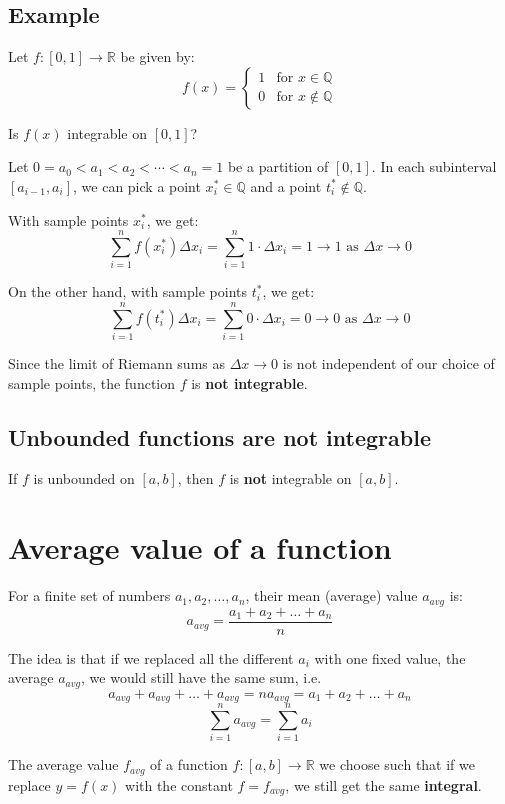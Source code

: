 \documentclass[11pt]{article}
\begin{document}
\subsection{Example}
\label{sec:orgc87e8b1}
Let \(f : [0, 1] \rightarrow \mathbb{R}\) be given by:
\[
f(x) = \begin{cases}
1 & \text{for } x \in \mathbb{Q} \\
0 & \text{for } x \notin \mathbb{Q}
\end{cases}
\]

Is \(f(x)\) integrable on \([0, 1]\)?


Let \(0 = a_0 < a_1 < a_2 < \cdots < a_n = 1\) be a partition of \([0, 1]\). In each subinterval \([a_{i - 1}, a_i]\), we can pick a point \(x_i^* \in \mathbb{Q}\) and a point \(t_i^* \notin \mathbb{Q}\).


With sample points \(x_i^*\), we get:
\[\sum_{i = 1}^n f(x_i^*) \Delta x_i = \sum_{i = 1}^n 1 \cdot \Delta x_i = 1 \rightarrow 1 \text{ as } \Delta x \rightarrow 0\]

On the other hand, with sample points \(t_i^*\), we get:
\[\sum_{i = 1}^n f(t_i^*) \Delta x_i = \sum _{i = 1}^n 0 \cdot \Delta x_i = 0 \rightarrow 0 \text{ as } \Delta x \rightarrow 0\]

Since the limit of Riemann sums as \(\Delta x \rightarrow 0\) is not independent of our choice of sample points, the function \(f\) is \textbf{not integrable}.
\subsection{Unbounded functions are not integrable}
\label{sec:org26e09a5}
If \(f\) is unbounded on \([a, b]\), then \(f\) is \textbf{not} integrable on \([a, b]\).

\newpage
\section{Average value of a function}
\label{sec:org84d25a4}
For a finite set of numbers \(a_1, a_2, \ldots, a_n\), their mean (average) value \(a_{avg}\) is:
\[a_{avg} = \frac{a_1 + a_2 + \ldots + a_n}{n}\]

The idea is that if we replaced all the different \(a_i\) with one fixed value, the average \(a_{avg}\), we would still have the same sum, i.e.
\[a_{avg} + a_{avg} + \ldots + a_{avg} = na_{avg} = a_1 + a_2 + \ldots + a_n\]
\[\sum_{i = 1}^n a_{avg} = \sum_{i = 1}^n a_i\]

The average value \(f_{avg}\) of a function \(f : [a, b] \rightarrow \mathbb{R}\) we choose such that if we replace \(y = f(x)\) with the constant \(f = f_{avg}\), we still get the same \textbf{integral}.
\end{document}

